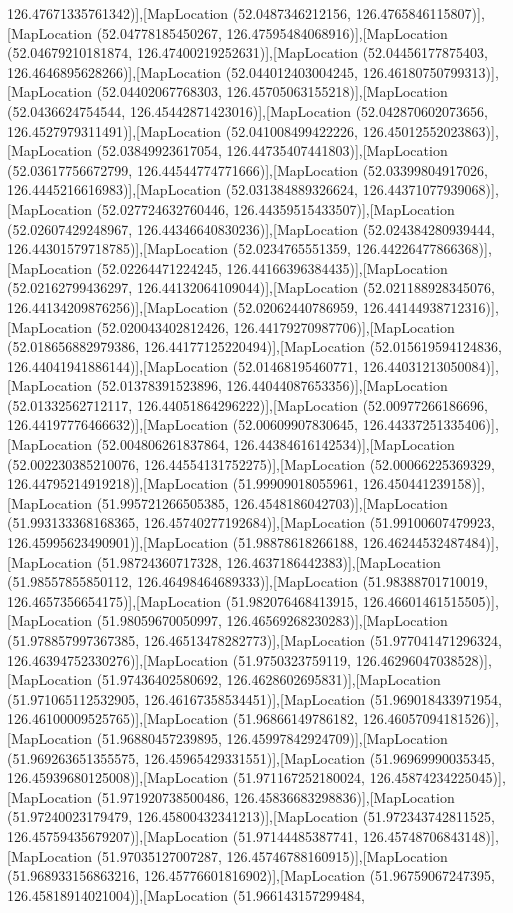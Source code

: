 126.47671335761342)],[MapLocation (52.0487346212156, 126.4765846115807)],[MapLocation (52.04778185450267, 126.47595484068916)],[MapLocation (52.04679210181874, 126.47400219252631)],[MapLocation (52.04456177875403, 126.4646895628266)],[MapLocation (52.044012403004245, 126.46180750799313)],[MapLocation (52.04402067768303, 126.45705063155218)],[MapLocation (52.0436624754544, 126.45442871423016)],[MapLocation (52.042870602073656, 126.4527979311491)],[MapLocation (52.041008499422226, 126.45012552023863)],[MapLocation (52.03849923617054, 126.44735407441803)],[MapLocation (52.03617756672799, 126.44544774771666)],[MapLocation (52.03399804917026, 126.4445216616983)],[MapLocation (52.031384889326624, 126.44371077939068)],[MapLocation (52.027724632760446, 126.44359515433507)],[MapLocation (52.02607429248967, 126.44346640830236)],[MapLocation (52.024384280939444, 126.44301579718785)],[MapLocation (52.0234765551359, 126.44226477866368)],[MapLocation (52.02264471224245, 126.44166396384435)],[MapLocation (52.02162799436297, 126.44132064109044)],[MapLocation (52.021188928345076, 126.44134209876256)],[MapLocation (52.02062440786959, 126.44144938712316)],[MapLocation (52.020043402812426, 126.44179270987706)],[MapLocation (52.018656882979386, 126.44177125220494)],[MapLocation (52.015619594124836, 126.44041941886144)],[MapLocation (52.01468195460771, 126.44031213050084)],[MapLocation (52.01378391523896, 126.44044087653356)],[MapLocation (52.01332562712117, 126.44051864296222)],[MapLocation (52.00977266186696, 126.44197776466632)],[MapLocation (52.00609907830645, 126.44337251335406)],[MapLocation (52.004806261837864, 126.44384616142534)],[MapLocation (52.002230385210076, 126.44554131752275)],[MapLocation (52.00066225369329, 126.44795214919218)],[MapLocation (51.99909018055961, 126.450441239158)],[MapLocation (51.995721266505385, 126.4548186042703)],[MapLocation (51.993133368168365, 126.45740277192684)],[MapLocation (51.99100607479923, 126.45995623490901)],[MapLocation (51.98878618266188, 126.46244532487484)],[MapLocation (51.98724360717328, 126.4637186442383)],[MapLocation (51.98557855850112, 126.46498464689333)],[MapLocation (51.98388701710019, 126.4657356654175)],[MapLocation (51.982076468413915, 126.46601461515505)],[MapLocation (51.98059670050997, 126.46569268230283)],[MapLocation (51.978857997367385, 126.46513478282773)],[MapLocation (51.977041471296324, 126.46394752330276)],[MapLocation (51.9750323759119, 126.46296047038528)],[MapLocation (51.97436402580692, 126.4628602695831)],[MapLocation (51.971065112532905, 126.46167358534451)],[MapLocation (51.969018433971954, 126.46100009525765)],[MapLocation (51.96866149786182, 126.46057094181526)],[MapLocation (51.96880457239895, 126.45997842924709)],[MapLocation (51.969263651355575, 126.45965429331551)],[MapLocation (51.96969990035345, 126.45939680125008)],[MapLocation (51.971167252180024, 126.45874234225045)],[MapLocation (51.971920738500486, 126.45836683298836)],[MapLocation (51.97240023179479, 126.45800432341213)],[MapLocation (51.972343742811525, 126.45759435679207)],[MapLocation (51.97144485387741, 126.45748706843148)],[MapLocation (51.97035127007287, 126.45746788160915)],[MapLocation (51.968933156863216, 126.45776601816902)],[MapLocation (51.96759067247395, 126.45818914021004)],[MapLocation (51.966143157299484, 